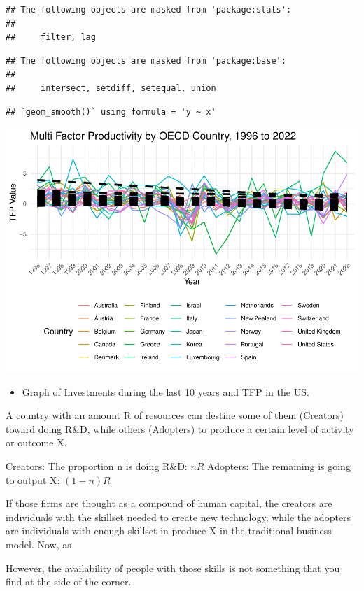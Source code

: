 \documentclass[preprint, 3p,
authoryear]{elsarticle} %
\providecommand{\tightlist}{%
  \setlength{\itemsep}{0pt}\setlength{\parskip}{0pt}}
\begin{document}
\begin{verbatim}
## The following objects are masked from 'package:stats':
## 
##     filter, lag
\end{verbatim}

\begin{verbatim}
## The following objects are masked from 'package:base':
## 
##     intersect, setdiff, setequal, union
\end{verbatim}

\begin{verbatim}
## `geom_smooth()` using formula = 'y ~ x'
\end{verbatim}

\includegraphics{Document_files/figure-latex/plot_TFP-1.pdf}

\begin{itemize}
\tightlist
\item
  Graph of Investments during the last 10 years and TFP in the US.
\end{itemize}

A country with an amount R of resources can destine some of them
(Creators) toward doing R\&D, while others (Adopters) to produce a
certain level of activity or outcome X.

Creators: The proportion n is doing R\&D: \(nR\) Adopters: The remaining
is going to output X: \((1-n)R\)

If those firms are thought as a compound of human capital, the creators
are individuals with the skillset needed to create new technology, while
the adopters are individuals with enough skillset in produce X in the
traditional business model. Now, as

However, the availability of people with those skills is not something
that you find at the side of the corner.
\end{document}
